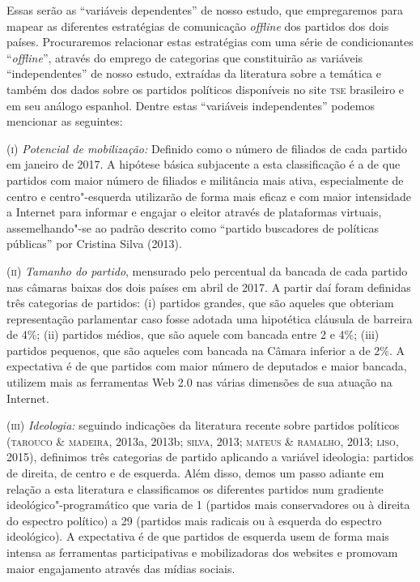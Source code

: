 Essas serão as ``variáveis dependentes'' de nosso estudo, que
empregaremos para mapear as diferentes estratégias de comunicação
\emph{offline} dos partidos dos dois países. Procuraremos relacionar estas
estratégias com uma série de condicionantes ``\emph{offline}'', através do
emprego de categorias que constituirão as variáveis ``independentes'' de
nosso estudo, extraídas da literatura sobre a temática e também dos
dados sobre os partidos políticos disponíveis no site \textsc{tse} brasileiro e
em seu análogo espanhol. Dentre estas ``variáveis independentes''
podemos mencionar as seguintes:

(\textsc{i}) \emph{Potencial de mobilização:} Definido como o número de
filiados de cada partido em janeiro de 2017. A hipótese básica
subjacente a esta classificação é a de que partidos com maior número de
filiados e militância mais ativa, especialmente de centro e
centro"-esquerda utilizarão de forma mais eficaz e com maior intensidade
a Internet para informar e engajar o eleitor através de plataformas
virtuais, assemelhando"-se ao padrão descrito como ``partido buscadores
de políticas públicas'' por Cristina Silva (2013).

(\textsc{ii}) \emph{Tamanho do partido}, mensurado pelo percentual da
bancada de cada partido nas câmaras baixas dos dois países em abril de
2017. A partir daí foram definidas três categorias de partidos: (i)
partidos grandes, que são aqueles que obteriam representação parlamentar
caso fosse adotada uma hipotética cláusula de barreira de 4\%; (ii)
partidos médios, que são aquele com bancada entre 2 e 4\%; (iii)
partidos pequenos, que são aqueles com bancada na Câmara inferior a de
2\%. A expectativa é de que partidos com maior número de deputados e
maior bancada, utilizem mais as ferramentas Web 2.0 nas várias dimensões
de sua atuação na Internet.

(\textsc{iii}) \emph{Ideologia:} seguindo indicações da literatura
recente sobre partidos políticos (\textsc{tarouco} \& \textsc{madeira}, 2013a, 2013b;
\textsc{silva}, 2013; \textsc{mateus} \& \textsc{ramalho}, 2013; \textsc{liso}, 2015), definimos três
categorias de partido aplicando a variável ideologia: partidos de
direita, de centro e de esquerda. Além disso, demos um passo adiante em
relação a esta literatura e classificamos os diferentes partidos num
gradiente ideológico"-programático que varia de 1 (partidos mais
conservadores ou à direita do espectro político) a 29 (partidos mais
radicais ou à esquerda do espectro ideológico). A expectativa é de que
partidos de esquerda usem de forma mais intensa as ferramentas
participativas e mobilizadoras dos websites e promovam maior engajamento
através das mídias sociais.

